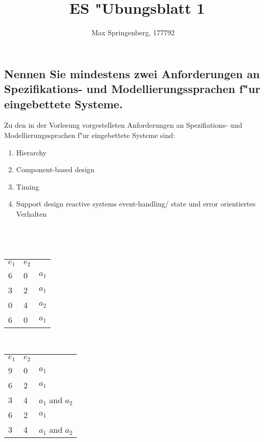 \documentclass{article}
\author{Max Springenberg, 177792}
\title{\
    ES "Ubungsblatt 1
    }
\date{}
\begin{document}
\maketitle
\newpage

\subsection{Nennen Sie mindestens zwei Anforderungen an Spezifikations- und 
            Modellierungssprachen f"ur eingebettete Systeme.}

Zu den in der Vorlesung vorgestelleten Anforderungen an Spezifiations- und 
    Modellierungssprachen f"ur eingebettete Systeme sind:\\

\begin{enumerate}
    \item Hierarchy
    \item Component-based design
    \item Timing
    \item Support design reactive systems
        \subitem event-handling/ state und error orientiertes Verhalten
\end{enumerate}

\subsection{}
\\

\subsection{}
\begin{tabular}{lll}
    $e_1$   &$e_2$      &\\
    6       &0          & $a_1$\\
    3       &2          & $a_1$\\
    0       &4          & $a_2$\\
    6       &0          & $a_1$\\
\end{tabular}\\
\begin{tabular}{lll}
    $e_1$   &$e_2$      &\\
    9       &0          & $a_1$\\
    6       &2          & $a_1$\\
    3       &4          & $a_1$ and $a_2$\\
    6       &2          & $a_1$\\
    3       &4          & $a_1$ and $a_2$\\
\end{tabular}
\end{document}
